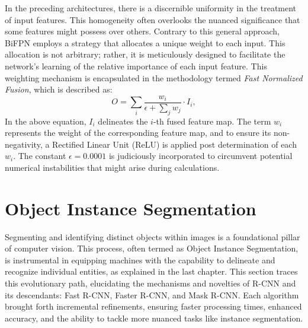 In the preceding architectures, there is a discernible uniformity in the treatment of input features. This homogeneity often overlooks the nuanced significance that some features might possess over others. Contrary to this general approach, BiFPN employs a strategy that allocates a unique weight to each input. This allocation is not arbitrary; rather, it is meticulously designed to facilitate the network's learning of the relative importance of each input feature. This weighting mechanism is encapsulated in the methodology termed \textit{Fast Normalized Fusion}, which is described as:
\begin{equation}
O=\sum_i \frac{w_i}{\epsilon+\sum_j w_j} \cdot I_i,
\end{equation}
In the above equation, \(I_i\) delineates the \(i\)-th fused feature map. The term \(w_i\) represents the weight of the corresponding feature map, and to ensure its non-negativity, a Rectified Linear Unit (ReLU) is applied post determination of each \(w_i\). The constant \(\epsilon=0.0001\) is judiciously incorporated to circumvent potential numerical instabilities that might arise during calculations.

\section{Object Instance Segmentation}
Segmenting and identifying distinct objects within images is a foundational pillar of computer vision. This process, often termed as Object Instance Segmentation, is instrumental in equipping machines with the capability to delineate and recognize individual entities, as explained in the last chapter. This section traces this evolutionary path, elucidating the mechanisms and novelties of R-CNN and its descendants: Fast R-CNN, Faster R-CNN, and Mask R-CNN. Each algorithm brought forth incremental refinements, ensuring faster processing times, enhanced accuracy, and the ability to tackle more nuanced tasks like instance segmentation.

